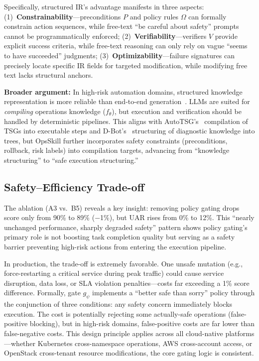 \documentclass[conference,10pt]{IEEEtran}
\begin{document}
Specifically, structured IR's advantage manifests in three aspects: (1)~\textbf{Constrainability}---preconditions $P$ and policy rules $\Omega$ can formally constrain action sequences, while free-text ``be careful about safety'' prompts cannot be programmatically enforced; (2)~\textbf{Verifiability}---verifiers $V$ provide explicit success criteria, while free-text reasoning can only rely on vague ``seems to have succeeded'' judgments; (3)~\textbf{Optimizability}---failure signatures can precisely locate specific IR fields for targeted modification, while modifying free text lacks structural anchors.

\textbf{Broader argument:} In high-risk automation domains, structured knowledge representation is more reliable than end-to-end generation~\cite{cheng2023aiops}.
LLMs are suited for \emph{compiling} operations knowledge ($f_\theta$), but execution and verification should be handled by deterministic pipelines.
This aligns with AutoTSG's~\cite{shetty2022autotsg} compilation of TSGs into executable steps and D-Bot's~\cite{zhou2023dbot} structuring of diagnostic knowledge into trees, but OpsSkill further incorporates safety constraints (preconditions, rollback, risk labels) into compilation targets, advancing from ``knowledge structuring'' to ``safe execution structuring.''

\subsection{Safety--Efficiency Trade-off}

The ablation (A3 vs.\ B5) reveals a key insight: removing policy gating drops score only from 90\% to 89\% ($-$1\%), but UAR rises from 0\% to 12\%.
This ``nearly unchanged performance, sharply degraded safety'' pattern shows policy gating's primary role is not boosting task completion quality but serving as a safety barrier preventing high-risk actions from entering the execution pipeline.

In production, the trade-off is extremely favorable.
One unsafe mutation (e.g., force-restarting a critical service during peak traffic) could cause service disruption, data loss, or SLA violation penalties---costs far exceeding a 1\% score difference.
Formally, gate $g_\psi$ implements a ``better safe than sorry'' policy through the conjunction of three conditions: any safety concern immediately blocks execution.
The cost is potentially rejecting some actually-safe operations (false-positive blocking), but in high-risk domains, false-positive costs are far lower than false-negative costs.
This design principle applies across all cloud-native platforms---whether Kubernetes cross-namespace operations, AWS cross-account access, or OpenStack cross-tenant resource modifications, the core gating logic is consistent.
\end{document}
